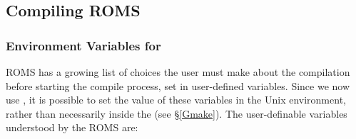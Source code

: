 \subsection{Compiling ROMS}
\label{Build}

\subsubsection{Environment Variables for }
\label{make_var}

ROMS has a growing list of choices the user must make about the
compilation before starting the compile process,
set in user-defined variables. Since we now use , it is
possible to set the value of these variables in the Unix environment,
rather than necessarily inside the  (see \S\ref{Gmake}).
The user-definable variables understood by the ROMS  are:

